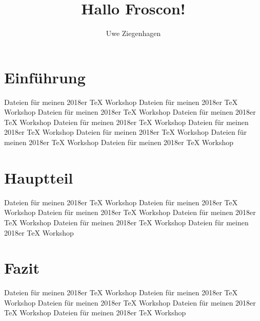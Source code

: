 \documentclass[ngerman]{article}
\title{Hallo Froscon!}
\author{Uwe Ziegenhagen}
\begin{document}
\maketitle

\tableofcontents

\section{Einführung}

Dateien für meinen 2018er TeX Workshop Dateien für meinen 2018er TeX Workshop Dateien für meinen 2018er TeX Workshop Dateien für meinen 2018er TeX Workshop Dateien für meinen 2018er TeX Workshop Dateien für meinen 2018er TeX Workshop Dateien für meinen 2018er TeX Workshop Dateien für meinen 2018er TeX Workshop Dateien für meinen 2018er TeX Workshop 

\section{Hauptteil}

Dateien für meinen 2018er TeX Workshop Dateien für meinen 2018er TeX Workshop Dateien für meinen 2018er TeX Workshop Dateien für meinen 2018er TeX Workshop Dateien für meinen 2018er TeX Workshop Dateien für meinen 2018er TeX Workshop 

\section{Fazit}

Dateien für meinen 2018er TeX Workshop Dateien für meinen 2018er TeX Workshop Dateien für meinen 2018er TeX Workshop Dateien für meinen 2018er TeX Workshop Dateien für meinen 2018er TeX Workshop 
\end{document}
